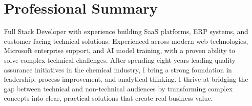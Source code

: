 
\section{Professional Summary}

\small{
Full Stack Developer with experience building SaaS platforms, ERP systems, and customer-facing technical solutions. Experienced across modern web technologies, Microsoft enterprise support, and AI model training, with a proven ability to solve complex technical challenges. After spending eight years leading quality assurance initiatives in the chemical industry, I bring a strong foundation in leadership, process improvement, and analytical thinking. I thrive at bridging the gap between technical and non-technical audiences by transforming complex concepts into clear, practical solutions that create real business value.
}

\vspace{8pt}